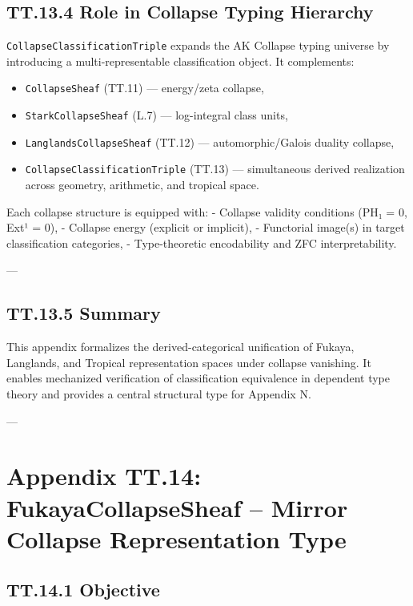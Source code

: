 \documentclass[11pt]{article}
\begin{document}
\subsection*{TT.13.4 Role in Collapse Typing Hierarchy}

\texttt{CollapseClassificationTriple} expands the AK Collapse typing universe by introducing  
a multi-representable classification object. It complements:

\begin{itemize}
  \item \texttt{CollapseSheaf} (TT.11) — energy/zeta collapse,
  \item \texttt{StarkCollapseSheaf} (L.7) — log-integral class units,
  \item \texttt{LanglandsCollapseSheaf} (TT.12) — automorphic/Galois duality collapse,
  \item \texttt{CollapseClassificationTriple} (TT.13) — simultaneous derived realization across geometry, arithmetic, and tropical space.
\end{itemize}

Each collapse structure is equipped with:
- Collapse validity conditions (PH₁ = 0, Ext¹ = 0),
- Collapse energy (explicit or implicit),
- Functorial image(s) in target classification categories,
- Type-theoretic encodability and ZFC interpretability.

---

\subsection*{TT.13.5 Summary}

This appendix formalizes the derived-categorical unification of  
Fukaya, Langlands, and Tropical representation spaces under collapse vanishing.  
It enables mechanized verification of classification equivalence  
in dependent type theory and provides a central structural type for Appendix N.

---

\section*{Appendix TT.14: FukayaCollapseSheaf – Mirror Collapse Representation Type}

\subsection*{TT.14.1 Objective}
\end{document}

